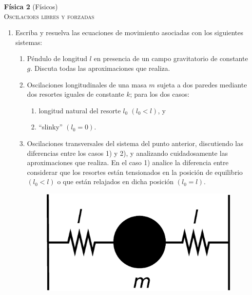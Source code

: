 \documentclass[11pt,spanish,a4paper]{article}
\begin{document}
\begin{center}
\textbf{Física 2} (Físicos) \hfill {}\\
	\textsc{\LARGE Oscilacioes libres y forzadas}
\end{center}


\begin{enumerate}

\section*{Oscilador armónico de un único grado de libertad}

\item Escriba y resuelva las ecuaciones de movimiento asociadas con los
siguientes sistemas: 
\begin{enumerate}
\item Péndulo de longitud $l$ en presencia de un campo gravitatorio de
constante $g$. Discuta todas las aproximaciones que realiza.
\item Oscilaciones longitudinales de una masa $m$ sujeta a dos paredes
mediante dos resortes iguales de constante $k$; para los dos casos: 

\begin{enumerate}
\item longitud natural del resorte $l_{0}$ $(l_{0}<l)$, y 
\item ``slinky'' $(l_{0}=0)$. 
\end{enumerate}
\item Oscilaciones transversales del sistema del punto anterior, discutiendo
las diferencias entre los casos 1) y 2), y analizando cuidadosamente
las aproximaciones que realiza. En el caso 1) analice la diferencia
entre considerar que los resortes están tensionados en la posición
de equilibrio $(l_{0}<l)$ o que están relajados en dicha posición
$(l_{0}=l)$.
\begin{figure}[H]
\centering{}\includegraphics[clip,scale=0.25]{ej1-1}
\end{figure}


\end{enumerate}
\end{enumerate}
\end{document}

